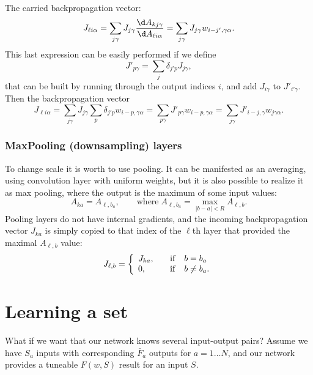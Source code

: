 \documentclass{article}
\begin{document}
The carried backpropagation vector:
\begin{equation}
  J_{\ell i\alpha} = \sum_{j\gamma} J_{j\gamma} \frac{\d
    A_{kj\gamma}}{\d A_{\ell i\alpha }} = \sum_{j\gamma} J_{j\gamma}
  w_{i-j',\gamma\alpha}.
\end{equation}
This last expression can be easily performed if we define
\begin{equation}
  J'_{p\gamma}= \sum_j \delta_{j'p}J_{j\gamma},
\end{equation}
that can be built by running through the output indices $i$, and add
$J_{i\gamma}$ to $J'_{i'\gamma}$. Then the backpropagation vector
\begin{equation}
  J_{\ell i\alpha} =  \sum_{j\gamma} J_{j\gamma}\sum_p \delta_{j'p}
  w_{i-p,\gamma\alpha} =\sum_{p\gamma} J'_{p\gamma}
  w_{i-p,\gamma\alpha}  =\sum_{j\gamma} J'_{i-j,\gamma} w_{j\gamma\alpha}. 
\end{equation}


\subsubsection{MaxPooling (downsampling) layers}

To change scale it is worth to use pooling. It can be manifested as an
averaging, using convolution layer with uniform weights, but it is
also possible to realize it as max pooling, where the output is the
maximum of some input values:
\begin{equation}
  A_{ka} = A_{\ell,b_a},\qquad \mathrm{where}\;
  A_{\ell,b_a}=\max_{|b-a|<R} A_{\ell,b}.
\end{equation}
Pooling layers do not have internal gradients, and the incoming
backpropagation vector $J_{ka}$ is simply copied to that index of the
$\ell$th layer that provided the maximal $A_{\ell,b}$ value:
\begin{equation}
  J_{\ell,b} = \left\{
    \begin{array}[c]{ll}
      J_{ka},\quad&\mathrm{if}\quad b=b_a\cr
      0,\quad&\mathrm{if}\quad b\neq b_a.\cr
    \end{array}
  \right.
\end{equation}

\section{Learning a set}

What if we want that our network knows several input-output pairs?
Assume we have $S_a$ inputs with corresponding $\bar F_a$ outputs for
$a=1\dots N$, and our network provides a tuneable $F(w,S)$ result for
an input $S$.
\end{document}
